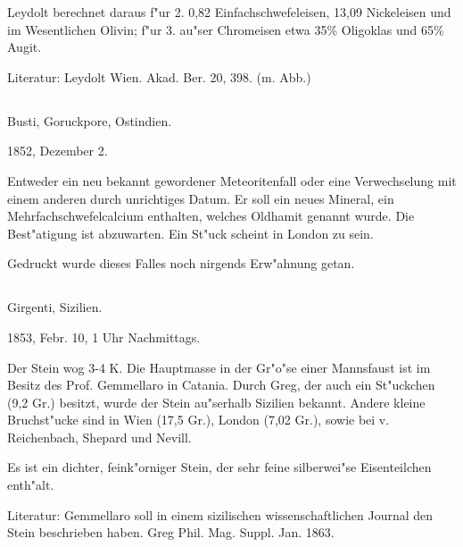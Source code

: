 \documentclass[a4paper, 11pt, oneside]{article}
\begin{document}
Leydolt berechnet daraus f"ur 2. 0,82 Einfachschwefeleisen, 13,09 Nickeleisen und im Wesentlichen Olivin; f"ur 3. au"ser Chromeisen etwa 35\% Oligoklas und 65\% Augit.

\normalsize
Literatur: Leydolt Wien. Akad. Ber. 20, 398. (m. Abb.)

\subsection{}
\LARGE
\paragraph{}
Busti, Goruckpore, Ostindien.

1852, Dezember 2.

Entweder ein neu bekannt gewordener Meteoritenfall oder eine Verwechselung mit einem anderen durch unrichtiges Datum. Er soll ein neues Mineral, ein Mehrfachschwefelcalcium enthalten, welches Oldhamit genannt wurde. Die Best"atigung ist abzuwarten. Ein St"uck scheint in London zu sein.

Gedruckt wurde dieses Falles noch nirgends Erw"ahnung getan.

\subsection{}
\LARGE
\paragraph{}
Girgenti, Sizilien.

1853, Febr. 10, 1 Uhr Nachmittags.

Der Stein wog 3-4 K. Die Hauptmasse in der Gr"o"se einer Mannsfaust ist im Besitz des Prof. Gemmellaro in Catania. Durch Greg, der auch ein St"uckchen (9,2 Gr.) besitzt, wurde der Stein au"serhalb Sizilien bekannt. Andere kleine Bruchst"ucke sind in Wien (17,5 Gr.), London (7,02 Gr.), sowie bei v. Reichenbach, Shepard und Nevill.

Es ist ein dichter, feink"orniger Stein, der sehr feine silberwei"se Eisenteilchen enth"alt.

\normalsize
Literatur: Gemmellaro soll in einem sizilischen wissenschaftlichen Journal den Stein beschrieben haben. Greg Phil. Mag. Suppl. Jan. 1863.

\subsection{}
\LARGE
\end{document}
